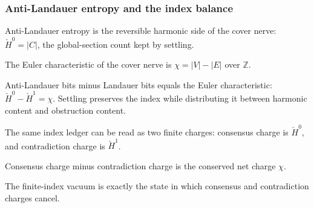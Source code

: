 \subsubsection{Anti-Landauer entropy and the index balance}

\begin{proposition}\label{thm:anti-landauer-bits}\leanok{}
Anti-Landauer entropy is the reversible harmonic side of the cover nerve:
$\check H^0=|C|$, the global-section count kept by settling.
\end{proposition}

\begin{proposition}\label{thm:nerve-euler-char}\leanok{}
The Euler characteristic of the cover nerve is $\chi=|V|-|E|$ over
$\mathbb Z$.
\end{proposition}

\begin{theorem}[The index balance $\check H^0-\check H^1=\chi$]\label{thm:anti-landauer-index-balance}\leanok{}
Anti-Landauer bits minus Landauer bits equals the Euler characteristic:
$\check H^0-\check H^1=\chi$. Settling preserves the index while distributing
it between harmonic content and obstruction content.
\end{theorem}

\begin{proposition}\label{thm:consensus-contradiction-charges}\leanok{}
The same index ledger can be read as two finite charges: consensus charge is
$\check H^0$, and contradiction charge is $\check H^1$.
\end{proposition}

\begin{theorem}\label{thm:net-charge-balance}\leanok{}
Consensus charge minus contradiction charge is the conserved net charge
$\chi$.
\end{theorem}

\begin{theorem}\label{thm:anti-landauer-vacuum}\leanok{}
The finite-index vacuum is exactly the state in which consensus and
contradiction charges cancel.
\end{theorem}

